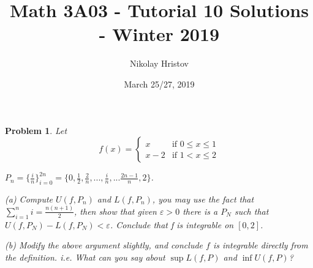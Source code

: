 \documentclass[11pt]{article}
\theoremstyle{plain}
\newtheorem{problem}{Problem}
\theoremstyle{remark}
\newcommand{\eps}{\varepsilon}
\begin{document}
	\title{Math 3A03 - Tutorial 10 Solutions - Winter 2019}
	\author{Nikolay Hristov}
	\date{March 25/27, 2019}
	\maketitle
	
\begin{problem}Let
	\[
	f(x) = \begin{cases}
	x &\text{if $0\leq x\leq 1$}\\
	x-2 &\text{if $1<x \leq 2$}
	\end{cases}
	\]
	
	$P_n=\{\frac i n\}_{i=0}^{2n}= \{0,\frac 1 2, \frac 2 n, ... ,\frac i n, ...\frac {2n-1} n, 2\}$. 
	
	(a) Compute $U(f,P_n)$ and $L(f,P_n)$, you may use the fact that $\sum_{i=1}^n i = \frac{n(n+1)}{2}$, then show that given $\eps>0$ there is a $P_N$ such that $U(f,P_N)-L(f,P_N)<\eps$. Conclude that f is integrable on $[0,2]$.
	
	(b) Modify the above argument slightly, and conclude $f$ is integrable directly from the definition. i.e. What can you say about $\sup L(f,P)$ and $\inf U(f,P)$?
\end{problem}
\end{document}
